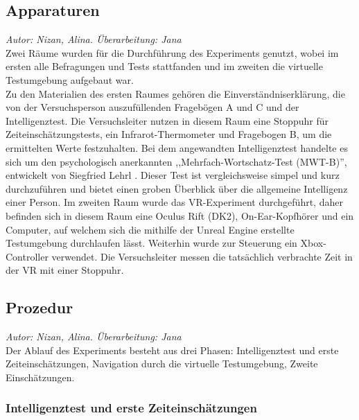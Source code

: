 \documentclass{Paper}
\begin{document}
        \subsection{Apparaturen}
                \textit{Autor: Nizan, Alina. Überarbeitung: Jana}\\
Zwei Räume wurden für die Durchführung des Experiments genutzt, wobei im ersten alle Befragungen und Tests stattfanden und im zweiten die virtuelle Testumgebung aufgebaut war.\\
Zu den Materialien des ersten Raumes gehören die Einverständniserklärung, die von der Versuchsperson auszufüllenden Fragebögen A und C und der Intelligenztest.
Die Versuchsleiter nutzen in diesem Raum eine Stoppuhr für Zeiteinschätzungstests, ein Infrarot-Thermometer und Fragebogen B, um die ermittelten Werte festzuhalten.
Bei dem angewandten Intelligenztest handelte es sich um den psychologisch anerkannten ,,Mehrfach-Wortschatz-Test (MWT-B)'', entwickelt von Siegfried Lehrl \cite{MWT-B}. Dieser Test ist vergleichsweise simpel und kurz durchzuführen und bietet einen groben Überblick über die allgemeine Intelligenz einer Person. 
Im zweiten Raum wurde das VR-Experiment durchgeführt, daher befinden sich in diesem Raum eine Oculus Rift (DK2), On-Ear-Kopfhörer und ein Computer, auf welchem sich die mithilfe der Unreal Engine erstellte Testumgebung durchlaufen lässt. Weiterhin wurde zur Steuerung ein Xbox-Controller verwendet. Die Versuchsleiter messen die tatsächlich verbrachte Zeit in der VR mit einer Stoppuhr.
\subsection{Prozedur}
        \textit{Autor: Nizan, Alina. Überarbeitung: Jana}\\
Der Ablauf des Experiments besteht aus drei Phasen: Intelligenztest und erste Zeiteinschätzungen, Navigation durch die virtuelle Testumgebung, Zweite Einschätzungen.
\subsubsection{Intelligenztest und erste Zeiteinschätzungen}
\end{document}
